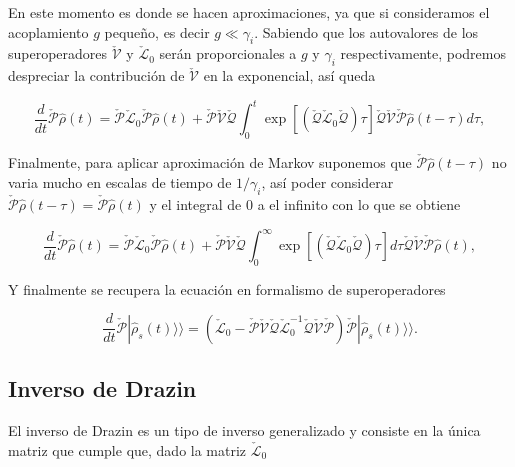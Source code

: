 \begin{appendixs}
En este momento es donde se hacen aproximaciones, ya que si consideramos el acoplamiento $g$ pequeño, es decir $g \ll \gamma_{i}$. Sabiendo que los autovalores de los superoperadores $\check{\mathcal{V}}$ y $\check{\mathcal{L}}_{0}$ serán proporcionales a $g$ y $\gamma_{i}$ respectivamente,  podremos despreciar la contribución de $\check{\mathcal{V}}$ en la exponencial, así queda

\begin{equation*}
    \frac{d}{dt}\check{\mathcal{P}}\hat{\rho}(t) = \check{\mathcal{P}}\check{\mathcal{L}}_{0}\check{\mathcal{P}}\hat{\rho}(t) + \check{\mathcal{P}}\check{\mathcal{V}}\check{\mathcal{Q}}\int_{0}^{t}\exp \left[\left( \check{\mathcal{Q}}\check{\mathcal{L}}_{0}\check{\mathcal{Q}}\right)\tau \right]\check{\mathcal{Q}}\check{\mathcal{V}} \check{\mathcal{P}}\hat{\rho}(t-\tau)d\tau,        
\end{equation*}

Finalmente, para aplicar aproximación de Markov suponemos que $\check{\mathcal{P}}\hat{\rho}(t-\tau)$ no varia mucho en escalas de tiempo de $1/\gamma_{i}$, así poder considerar $\check{\mathcal{P}}\hat{\rho}(t-\tau) = \check{\mathcal{P}}\hat{\rho}(t)$ y el integral de $0$ a el infinito con lo que se obtiene

\begin{equation*}
    \frac{d}{dt}\check{\mathcal{P}}\hat{\rho}(t) = \check{\mathcal{P}}\check{\mathcal{L}}_{0}\check{\mathcal{P}}\hat{\rho}(t) + \check{\mathcal{P}}\check{\mathcal{V}}\check{\mathcal{Q}}\int_{0}^{\infty}\exp \left[\left( \check{\mathcal{Q}}\check{\mathcal{L}}_{0}\check{\mathcal{Q}}\right)\tau \right]d\tau \check{\mathcal{Q}}\check{\mathcal{V}} \check{\mathcal{P}}\hat{\rho}(t),        
\end{equation*}

Y finalmente se recupera la ecuación en formalismo de superoperadores  

\begin{equation*}
    \frac{d}{dt}\check{\mathcal{P}}|\hat{\rho}_{s}(t)\rangle \rangle = (\check{\mathcal{L}}_{0} - \check{\mathcal{P}}\check{\mathcal{V}}\check{\mathcal{Q}}\check{\mathcal{L}}^{-1}_{0}\check{\mathcal{Q}}\check{\mathcal{V}}\check{\mathcal{P}})\check{\mathcal{P}}|\hat{\rho}_{s}(t)\rangle \rangle. 
\end{equation*}



\label{appendix5clasic}

\subsection{ Inverso de Drazin }
El inverso de Drazin es un tipo de inverso generalizado y consiste en la única matriz que cumple que, dado la matriz $\check{\mathcal{L}}_{0}$


\end{appendixs}
